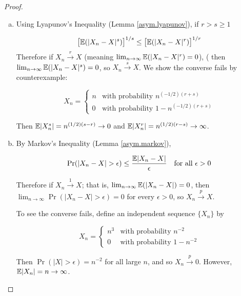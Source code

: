 \begin{proof}
\begin{enumerate}[(a)]
\item
Using Lyapunov's Inequality (Lemma \ref{asym.lyapunov}), if \(r > s \geq 1\)

\[
\big[ \mathbb{E}(|X_n - X|^s) \big]^{1/s} \leq \big[ \mathbb{E}(|X_n - X|^r) \big]^{1/r}
\]
Therefore if \(X_n \xrightarrow{r} X\) (meaning \(\lim_{n \to \infty} \mathbb{E}(|X_n - X|^r) = 0\)), ( then  \(\lim_{n \to \infty} \mathbb{E}(|X_n - X|^s) = 0\), so \(X_n \xrightarrow{s} X\). We show the converse fails by counterexample:

\[
X_n = \begin{cases}
n & \text{with probability } n^{(-1/2)(r+s)} \\
0 & \text{with probability } 1 -  n^{(-1/2)(r+s)}
\end{cases}
\]

Then \(\mathbb{E}|X_n^s| = n^{(1/2)(s-r)} \to 0\) and \(\mathbb{E}|X_n^r| = n^{(1/2)(r-s)} \to \infty\).

\item By Markov's Inequality (Lemma \ref{asym.markov}),

\[
\Pr(|X_n - X| > \epsilon) \leq \frac{\mathbb{E}|X_n - X|}{\epsilon} \ \ \text{ for all } \epsilon > 0
\]

Therefore if \(X_n \xrightarrow{1} X\); that is, \(\lim_{n \to \infty} \mathbb{E}(|X_n - X|) = 0\), then \(\lim_{n \to \infty} \Pr(|X_n -X| > \epsilon) = 0\) for every \(\epsilon > 0\), so \(X_n \xrightarrow{p} X\).

To see the converse fails, define an independent sequence \(\{X_n\}\) by 

\[
X_n = \begin{cases}
n^3 & \text{with probability } n^{-2} \\
0 & \text{with probability } 1 - n^{-2}
\end{cases}
\]

Then \(\Pr(|X| > \epsilon) = n^{-2}\) for all large \(n\), and so \(X_n \xrightarrow{p} 0\). However, \(\mathbb{E}|X_n| = n \to \infty\).
\end{enumerate}
\end{proof}


